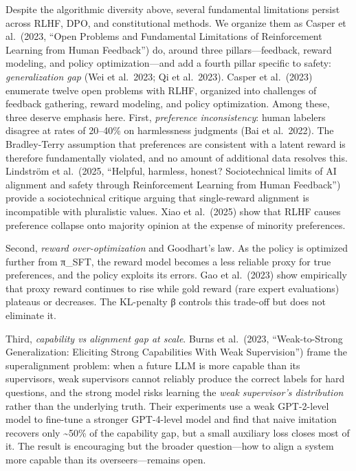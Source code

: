 \documentclass{article}
\begin{document}
Despite the algorithmic diversity above, several fundamental limitations persist across RLHF, DPO, and constitutional methods. We organize them as Casper et al.~(2023, ``Open Problems and Fundamental Limitations of Reinforcement Learning from Human Feedback'') do, around three pillars---feedback, reward modeling, and policy optimization---and add a fourth pillar specific to safety: \emph{generalization gap} (Wei et al.~2023; Qi et al.~2023). Casper et al.~(2023) enumerate twelve open problems with RLHF, organized into challenges of feedback gathering, reward modeling, and policy optimization. Among these, three deserve emphasis here. First, \emph{preference inconsistency}: human labelers disagree at rates of 20--40\% on harmlessness judgments (Bai et al.~2022). The Bradley-Terry assumption that preferences are consistent with a latent reward is therefore fundamentally violated, and no amount of additional data resolves this. Lindström et al.~(2025, ``Helpful, harmless, honest? Sociotechnical limits of AI alignment and safety through Reinforcement Learning from Human Feedback'') provide a sociotechnical critique arguing that single-reward alignment is incompatible with pluralistic values. Xiao et al.~(2025) show that RLHF causes preference collapse onto majority opinion at the expense of minority preferences.

Second, \emph{reward over-optimization} and Goodhart's law. As the policy is optimized further from π\_SFT, the reward model becomes a less reliable proxy for true preferences, and the policy exploits its errors. Gao et al.~(2023) show empirically that proxy reward continues to rise while gold reward (rare expert evaluations) plateaus or decreases. The KL-penalty β controls this trade-off but does not eliminate it.

Third, \emph{capability vs alignment gap at scale}. Burns et al.~(2023, ``Weak-to-Strong Generalization: Eliciting Strong Capabilities With Weak Supervision'') frame the superalignment problem: when a future LLM is more capable than its supervisors, weak supervisors cannot reliably produce the correct labels for hard questions, and the strong model risks learning the \emph{weak supervisor's distribution} rather than the underlying truth. Their experiments use a weak GPT-2-level model to fine-tune a stronger GPT-4-level model and find that naive imitation recovers only \textasciitilde50\% of the capability gap, but a small auxiliary loss closes most of it. The result is encouraging but the broader question---how to align a system more capable than its overseers---remains open.
\end{document}
